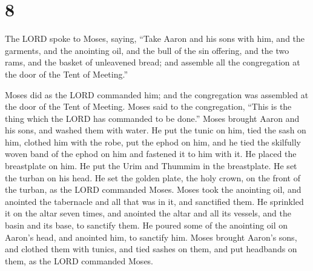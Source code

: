 \hypertarget{section-7}{%
\section{8}\label{section-7}}

 The LORD spoke to Moses, saying,  ``Take
Aaron and his sons with him, and the garments, and the anointing oil,
and the bull of the sin offering, and the two rams, and the basket of
unleavened bread;  and assemble all the congregation at
the door of the Tent of Meeting.''

 Moses did as the LORD commanded him; and the congregation
was assembled at the door of the Tent of Meeting.  Moses
said to the congregation, ``This is the thing which the LORD has
commanded to be done.''  Moses brought Aaron and his sons,
and washed them with water.  He put the tunic on him, tied
the sash on him, clothed him with the robe, put the ephod on him, and he
tied the skilfully woven band of the ephod on him and fastened it to him
with it.  He placed the breastplate on him. He put the
Urim and Thummim in the breastplate.  He set the turban on
his head. He set the golden plate, the holy crown, on the front of the
turban, as the LORD commanded Moses.  Moses took the
anointing oil, and anointed the tabernacle and all that was in it, and
sanctified them.  He sprinkled it on the altar seven
times, and anointed the altar and all its vessels, and the basin and its
base, to sanctify them.  He poured some of the anointing
oil on Aaron's head, and anointed him, to sanctify him. 
Moses brought Aaron's sons, and clothed them with tunics, and tied
sashes on them, and put headbands on them, as the LORD commanded Moses.

